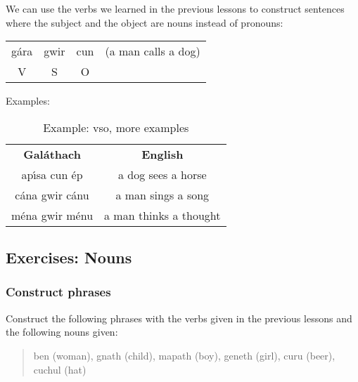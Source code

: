 We can use the verbs we learned in the previous lessons to construct sentences where the subject and the object are nouns instead of pronouns:
\begin{table}[H]
\begin{tabular}{cccc}
  g\'{a}ra & gwir & cun & (a man calls a dog)\\
  V & S & O &
\end{tabular}
\label{example_vso}
\end{table}

Examples:
\begin{table}[H]
\centering
\begin{tabular}{cc}
  \toprule
  \textbf{Gal\'{a}thach} & \textbf{English}\\
  \cmidrule(lr){1-1}\cmidrule(lr){2-2}
  ap\'{\i}sa cun \'{e}p & a dog sees a horse\\
  c\'{a}na gwir c\'{a}nu & a man sings a song\\
  m\'{e}na gwir m\'{e}nu & a man thinks a thought\\
  \bottomrule
\end{tabular}
\caption{Example: vso, more examples}
\label{example_vso_more_examples}
\end{table}

\newpage
\subsection{Exercises: Nouns}

\subsubsection{Construct phrases}

Construct the following phrases with the verbs given in the previous lessons and the following nouns given:

\begin{quote}
ben (woman), gnath (child), mapath (boy), geneth (girl), curu (beer), cuchul (hat)
\end{quote}

